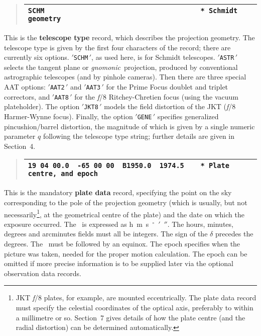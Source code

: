 \goodbreak
\begin{quote}
\begin{tabular}{|l|}
\hline
\verb|SCHM                                      * Schmidt geometry| \\
\hline
\end{tabular}
\end{quote}
This is the {\bf telescope type} record, which
describes the projection geometry.
The telescope type is given by the first four characters of the
record;  there are currently six options.
$'${\tt SCHM}$\,'$, as used here, is for Schmidt telescopes.
$'${\tt ASTR}$\,'$ selects the tangent plane or {\it gnomonic}\,
projection, produced by conventional astrographic telescopes
(and by pinhole cameras).
Then there are three special AAT options: $'${\tt AAT2}$\,'$
and $'${\tt AAT3}$\,'$ for
the Prime Focus doublet and triplet correctors, and $'${\tt AAT8}$\,'$ for
the {\it f}/8 Ritchey-Chretien focus (using the vacuum plateholder).
The option $'${\tt JKT8}$\,'$ models the field distortion
of the JKT ({\it f}/8 Harmer-Wynne focus).
Finally, the option $'${\tt GENE}$\,'$ specifies generalized
pincushion/barrel distortion, the magnitude of which is given
by a single numeric parameter $q$ following the telescope
type string; further details are given in Section~4.

\goodbreak
\begin{quote}
\begin{tabular}{|l|}
\hline
\verb|19 04 00.0  -65 00 00  B1950.0  1974.5    * Plate centre, and epoch| 
\\
\hline
\end{tabular}
\end{quote}
This is the mandatory {\bf plate data} record, specifying the point on
the sky corresponding to the pole of the projection
geometry (which is usually, but not
necessarily\footnote{JKT {\it f}/8 plates, for example, are
mounted eccentrically.  The plate data record must specify the
celestial coordinates of the optical axis, preferably to
within a millimetre or so.  Section~7 gives details of how the
plate centre (and the radial distortion) can be determined
automatically.}, at the geometrical centre of the plate)
and the date on which the exposure occurred.
The \radec\ is expressed
as h~m~s~$^\circ$~$'$~$''$.  The hours, minutes, degrees and
arcminutes fields must all be integers.  The sign of the $\delta$
precedes the degrees.  The \radec\ must be followed
by an equinox.
The epoch specifies when the picture
was taken, needed for the proper motion calculation.
The epoch can be omitted if more precise information is to be supplied
later via the optional observation data records.

